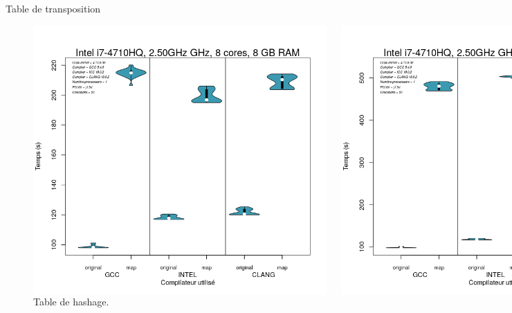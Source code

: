 \documentclass{beamer}
\begin{document}
\begin{frame}{Table de transposition}
	\begin{figure}
	\begin{columns}
      \includegraphics[width=\textwidth]{sorted_map.png}
      \caption{Arbre binaire de recherche.\label{Fig:arbre_binaire}}
      \includegraphics[width=\textwidth]{unsorted_map.png}
      \caption{Table de hashage.\label{Fig:arbre_binaire}}
    \end{columns}	
	\end{figure}
\end{frame}
\end{document}
